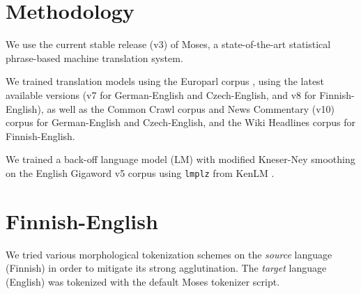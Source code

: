 \documentclass[11pt,a4paper]{article}
\begin{document}
\section{Methodology}

We use the current stable release (v3) of Moses, a state-of-the-art statistical phrase-based machine translation system.

We trained translation models using the Europarl corpus \cite{europarl}, using the latest available versions (v7 for German-English and Czech-English, and v8 for Finnish-English), as well as the Common Crawl corpus and News Commentary (v10) corpus for German-English and Czech-English, and the Wiki Headlines corpus for Finnish-English. 

We trained a back-off language model (LM) with modified Kneser-Ney smoothing \cite{backoff_lm,kneser_ney_smoothing,modified_kneser_ney_smoothing} on the English Gigaword v5 corpus \cite{gigaword_v5} using \texttt{lmplz} from KenLM \cite{lmplz}.




\section{Finnish-English}

We tried various morphological tokenization schemes on the \emph{source} language (Finnish) in order to mitigate its strong agglutination.
%
The \emph{target} language (English) was tokenized with the default Moses tokenizer script. 






\end{document}
